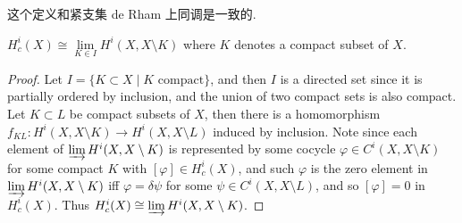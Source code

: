     这个定义和紧支集 de Rham 上同调是一致的.

    \begin{theorem}
        \( H_{c}^{i}(X) \cong \lim\limits_{K \in I} H^{i}(X, X \setminus K) \) where \( K \) denotes a compact subset of $X$.
    \end{theorem}
    \begin{proof}
        Let \( I = \{ K \subset X \mid K \text{ compact} \} \), 
        and then \( I \) is a directed set since it is partially ordered by inclusion, 
        and the union of two compact sets is also compact. 
        Let \( K \subset L \) be compact subsets of \( X \), 
        then there is a homomorphism \( f_{KL} : H^i(X, X \setminus K) \to H^i(X, X \setminus L) \) induced by inclusion. 
        Note since each element of \( \varinjlim H^i(X, X \setminus K) \) is represented by some cocycle \( \varphi \in C^i(X, X \setminus K) \) for some compact \( K \) with \( [\varphi] \in H_c^i(X) \), 
        and such \( \varphi \) is the zero element in \( \varinjlim H^i(X, X \setminus K) \) iff \( \varphi = \delta \psi \) for some \( \psi \in C^i(X, X \setminus L) \), 
        and so \( [\varphi] = 0 \) in \( H_c^i(X) \). 
        Thus \( H_c^i(X) \cong \varinjlim H^i(X, X \setminus K) \).
    \end{proof}

